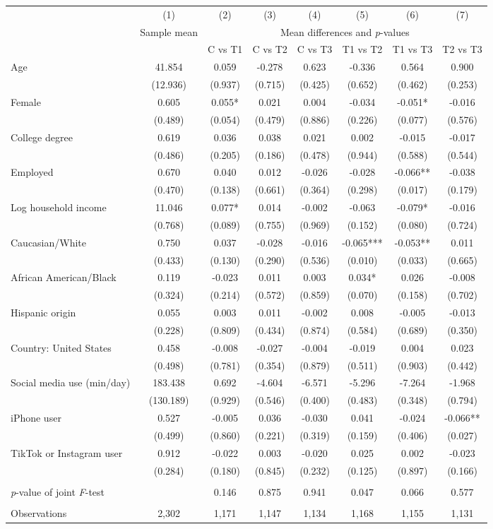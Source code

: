 \begin{tabular}{l*{7}c}
\toprule
 & (1) & (2) & (3) & (4) & (5) & (6) & (7) \\
 & \multicolumn{1}{c}{Sample mean} & \multicolumn{6}{c}{Mean differences and \textit{p}-values}\\ \cmidrule(lr){2-2} \cmidrule(lr){3-8}
  &  & C vs T1 & C vs T2 & C vs T3 & T1 vs T2 & T1 vs T3 & T2 vs T3 \\
\midrule
Age&41.854&0.059&-0.278&0.623&-0.336&0.564&0.900\\
&(12.936)&(0.937)&(0.715)&(0.425)&(0.652)&(0.462)&(0.253)\\
Female&0.605&0.055*&0.021&0.004&-0.034&-0.051*&-0.016\\
&(0.489)&(0.054)&(0.479)&(0.886)&(0.226)&(0.077)&(0.576)\\
College degree&0.619&0.036&0.038&0.021&0.002&-0.015&-0.017\\
&(0.486)&(0.205)&(0.186)&(0.478)&(0.944)&(0.588)&(0.544)\\
Employed&0.670&0.040&0.012&-0.026&-0.028&-0.066**&-0.038\\
&(0.470)&(0.138)&(0.661)&(0.364)&(0.298)&(0.017)&(0.179)\\
Log household income&11.046&0.077*&0.014&-0.002&-0.063&-0.079*&-0.016\\
&(0.768)&(0.089)&(0.755)&(0.969)&(0.152)&(0.080)&(0.724)\\
Caucasian/White&0.750&0.037&-0.028&-0.016&-0.065***&-0.053**&0.011\\
&(0.433)&(0.130)&(0.290)&(0.536)&(0.010)&(0.033)&(0.665)\\
African American/Black&0.119&-0.023&0.011&0.003&0.034*&0.026&-0.008\\
&(0.324)&(0.214)&(0.572)&(0.859)&(0.070)&(0.158)&(0.702)\\
Hispanic origin&0.055&0.003&0.011&-0.002&0.008&-0.005&-0.013\\
&(0.228)&(0.809)&(0.434)&(0.874)&(0.584)&(0.689)&(0.350)\\
Country: United States&0.458&-0.008&-0.027&-0.004&-0.019&0.004&0.023\\
&(0.498)&(0.781)&(0.354)&(0.879)&(0.511)&(0.903)&(0.442)\\
Social media use (min/day)&183.438&0.692&-4.604&-6.571&-5.296&-7.264&-1.968\\
&(130.189)&(0.929)&(0.546)&(0.400)&(0.483)&(0.348)&(0.794)\\
iPhone user&0.527&-0.005&0.036&-0.030&0.041&-0.024&-0.066**\\
&(0.499)&(0.860)&(0.221)&(0.319)&(0.159)&(0.406)&(0.027)\\
TikTok or Instagram user&0.912&-0.022&0.003&-0.020&0.025&0.002&-0.023\\
&(0.284)&(0.180)&(0.845)&(0.232)&(0.125)&(0.897)&(0.166)\\
& & & & & & & \\ \textit{p}-value of joint \textit{F}-test & & 0.146 & 0.875 & 0.941 & 0.047 & 0.066 & 0.577 \\ & & & & & & & \\ \midrule
Observations & 2,302 & 1,171 & 1,147 & 1,134 & 1,168 & 1,155 & 1,131 \\
\bottomrule
\end{tabular}
